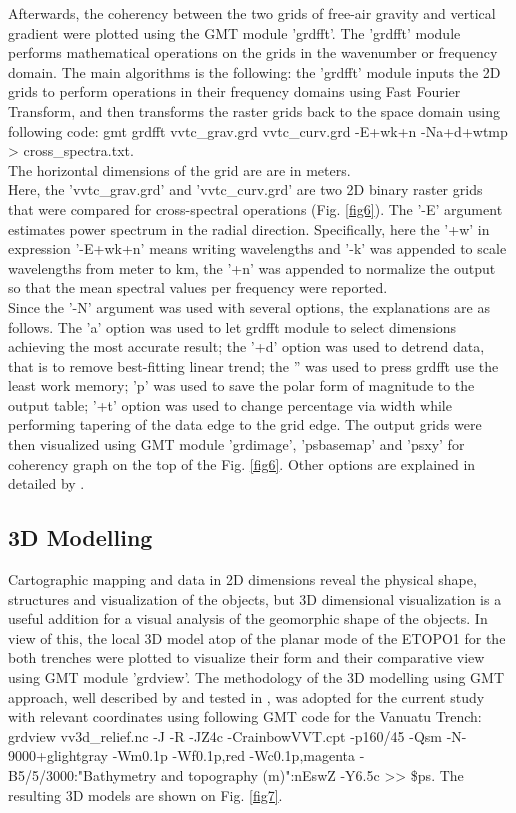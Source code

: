 \documentclass[USenglish]{article}
\begin{document}
Afterwards, the coherency between the two grids of free-air gravity and vertical gradient were plotted using the GMT module 'grdfft'. The 'grdfft' module performs mathematical operations on the grids in the wavenumber or frequency domain. The main algorithms is the following: the 'grdfft' module inputs the 2D grids to perform operations in their frequency domains using Fast Fourier Transform, and then transforms the raster grids back to the space domain using following code: gmt grdfft vvtc\_grav.grd vvtc\_curv.grd -E+wk+n -Na+d+wtmp > cross\_spectra.txt. \\
The horizontal dimensions of the grid are are in meters. \\
Here, the 'vvtc\_grav.grd' and 'vvtc\_curv.grd' are two 2D binary raster grids that were compared for cross-spectral operations (Fig. \ref{fig6}). The '-E' argument estimates power spectrum in the radial direction. Specifically, here the '+w' in expression '-E+wk+n' means writing wavelengths and '-k' was appended to scale wavelengths from meter to km, the '+n' was appended to normalize the output so that the mean spectral values per frequency were reported. \\
Since the '-N' argument was used with several options, the explanations are as follows. The 'a' option was used to let grdfft module to select dimensions achieving the most accurate result; the '+d' option was used to detrend data, that is to remove best-fitting linear trend; the '' was used to press grdfft use the least work memory; 'p' was used to save the polar form of magnitude to the output table; '+t' option was used to change percentage via width while performing tapering of the data edge to the grid edge. The output grids were then visualized using GMT module 'grdimage', 'psbasemap' and 'psxy' for coherency graph on the top of the Fig. \ref{fig6}. Other options are explained in detailed by \citet{Wesseletal2019}.

\subsection{3D Modelling}

Cartographic mapping and data in 2D dimensions reveal the physical shape, structures and visualization of the objects, but 3D dimensional visualization is a useful addition for a visual analysis of the geomorphic shape of the objects. In view of this, the local 3D model atop of the planar mode of the ETOPO1 for the both trenches were plotted to visualize their form and their comparative view using GMT module 'grdview'. The methodology of the 3D modelling using GMT approach, well described by \citet{Wesseletal2019} and tested in \citet{Lemenkova201995}, was adopted for the current study with relevant coordinates using following GMT code for the Vanuatu Trench: 
grdview vv3d\_relief.nc -J -R -JZ4c -CrainbowVVT.cpt -p160/45 -Qsm -N-9000+glightgray -Wm0.1p -Wf0.1p,red -Wc0.1p,magenta -B5/5/3000:"Bathymetry and topography (m)":nEswZ -Y6.5c >> \$ps. The resulting 3D models are shown on Fig. \ref{fig7}.
\end{document}
